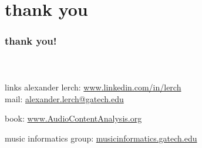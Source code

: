     \section[thanks]{thank you}

      \begin{frame}\frametitle{thank you!}\framesubtitle{~}
            \begin{block}{links}
                alexander lerch: \href{https://www.linkedin.com/in/lerch}{www.linkedin.com/in/lerch}\\             
                
								\bigskip
								mail: \href{mailto:alexander.lerch@gatech.edu}{alexander.lerch@gatech.edu}
                
                \bigskip                
                book: \href{https://www.AudioContentAnalysis.org}{www.AudioContentAnalysis.org}
                


								\bigskip
                music informatics group:
                \href{http://musicinformatics.gatech.edu}{musicinformatics.gatech.edu}
								
								\vspace{5mm}

            \end{block}
            
        \end{frame}
